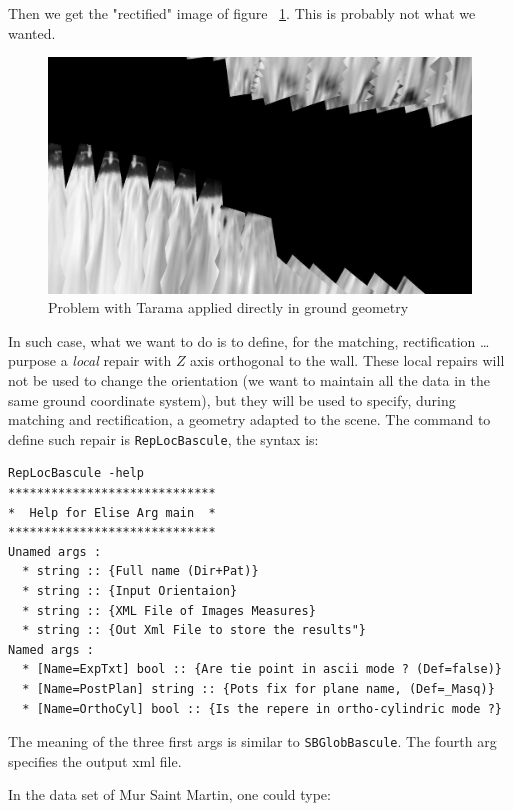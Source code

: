 Then we get the "rectified" image of figure ~\ref{FIG:PBRec:StMartin}. This
is probably not what we wanted.


\begin{figure}
\begin{center}
\includegraphics[width=120mm]{FIGS/MurSaintMartin/TA_PB_LeChantier.jpg}
\end{center}
\caption{Problem with Tarama applied directly in ground geometry}
\label{FIG:PBRec:StMartin}
\end{figure}

In such case, what we want to do is to define, for the matching, rectification \dots
purpose a \emph{local} repair with $Z$ axis orthogonal to the wall. These local repairs
will not be used to change the orientation (we want to maintain all the data in the
same ground coordinate system), but they will be used to specify, during matching
and rectification, a geometry adapted to the scene.
The command to define such repair is {\tt RepLocBascule}, the syntax is:

\begin{verbatim}
RepLocBascule -help
*****************************
*  Help for Elise Arg main  *
*****************************
Unamed args : 
  * string :: {Full name (Dir+Pat)}
  * string :: {Input Orientaion}
  * string :: {XML File of Images Measures}
  * string :: {Out Xml File to store the results"}
Named args : 
  * [Name=ExpTxt] bool :: {Are tie point in ascii mode ? (Def=false)}
  * [Name=PostPlan] string :: {Pots fix for plane name, (Def=_Masq)}
  * [Name=OrthoCyl] bool :: {Is the repere in ortho-cylindric mode ?}
\end{verbatim}

The meaning of the three first args is similar to {\tt SBGlobBascule}. The fourth 
arg specifies the output xml file.

In the data set of Mur Saint Martin, one could type:


